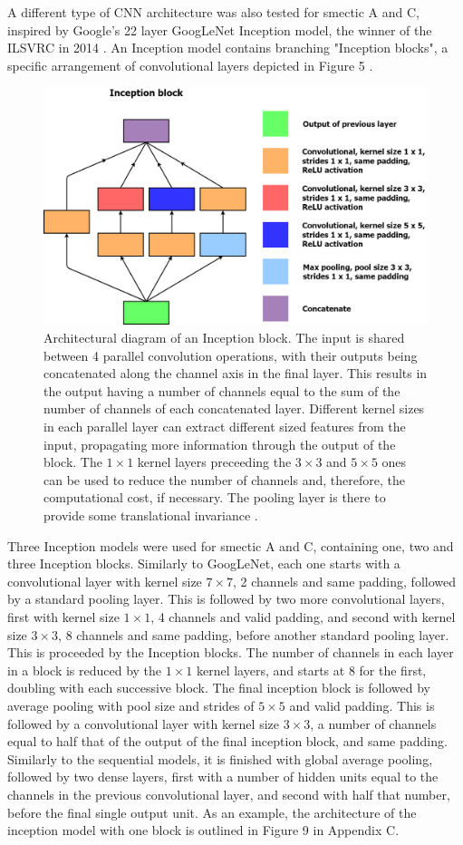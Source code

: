 \documentclass[12pt]{article}
\begin{document}
A different type of CNN architecture was also tested for smectic A and C, inspired by Google's 22 layer GoogLeNet Inception model, the winner of the ILSVRC in 2014 \cite{ILSVRC15}. An Inception model contains branching "Inception blocks", a specific arrangement of convolutional layers depicted in Figure 5 \cite{Szegedy2015}.  
\begin{figure}[!ht]
\centering
\includegraphics[width=5in]{images/inception_block.png}
\caption{Architectural diagram of an Inception block. The input is shared between 4 parallel convolution operations, with their outputs being concatenated along the channel axis in the final layer. This results in the output having a number of channels equal to the sum of the number of channels of each concatenated layer. Different kernel sizes in each parallel layer can extract different sized features from the input, propagating more information through the output of the block. The $1 \times 1$ kernel layers preceeding the $3 \times 3$ and $5 \times 5$ ones can be used to reduce the number of channels and, therefore, the computational cost, if necessary. The pooling layer is there to provide some translational invariance \cite{Szegedy2015}.}
\end{figure}
Three Inception models were used for smectic A and C, containing one, two and three Inception blocks. Similarly to GoogLeNet, each one starts with a convolutional layer with kernel size $7 \times 7$, 2 channels and same padding, followed by a standard pooling layer. This is followed by two more convolutional layers, first with kernel size $1 \times 1$, 4 channels and valid padding, and second with kernel size $3 \times 3$, 8 channels and same padding, before another standard pooling layer. This is proceeded by the Inception blocks. The number of channels in each layer in a block is reduced by the $1 \times 1$ kernel layers, and starts at 8 for the first, doubling with each successive block. The final inception block is followed by average pooling with pool size and strides of $5 \times 5$ and valid padding. This is followed by a convolutional layer with kernel size $3 \times 3$, a number of channels equal to half that of the output of the final inception block, and same padding. Similarly to the sequential models, it is finished with global average pooling, followed by two dense layers, first with a number of hidden units equal to the channels in the previous convolutional layer, and second with half that number, before the final single output unit. As an example, the architecture of the inception model with one block is outlined in Figure 9 in Appendix C.
\end{document}
